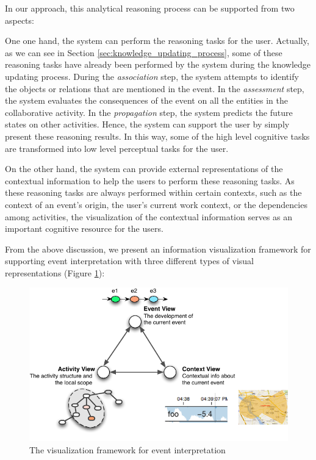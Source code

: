 In our approach, this analytical reasoning process can be supported from two aspects:

One one hand, the system can perform the reasoning tasks for the user. Actually, as we can see in Section \ref{sec:knowledge_updating_process}, some of these reasoning tasks have already been performed by the system during the knowledge updating process. During the \emph{association} step, the system attempts to identify the objects or relations that are mentioned in the event. In the \emph{assessment} step, the system evaluates the consequences of the event on all the entities in the collaborative activity. In the \emph{propagation} step, the system predicts the future states on other activities. Hence, the system can support the user by simply present these reasoning results. In this way, some of the high level cognitive tasks are transformed into low level perceptual tasks for the user.

On the other hand, the system can provide external representations of the contextual information to help the users to perform these reasoning tasks. As these reasoning tasks are always performed within certain contexts, such as the context of an event's origin, the user's current work context, or the dependencies among activities, the visualization of the contextual information serves as an important cognitive resource for the users.

From the above discussion, we present an information visualization framework for supporting event interpretation with three different types of visual representations (Figure \ref{fig:event_interpretation}):

\begin{figure}[htbp] %
	\centering
	\includegraphics{event_interpretation.pdf} 
	\caption{The visualization framework for event interpretation}
	\label{fig:event_interpretation}
\end{figure}

